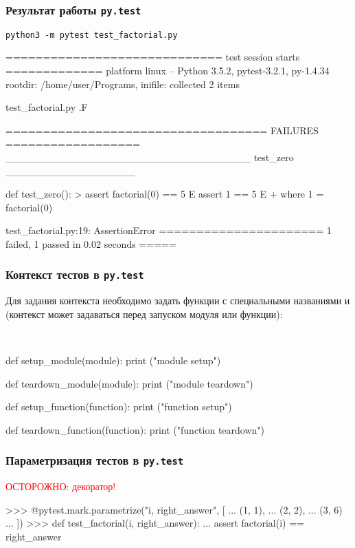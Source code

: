 \documentclass[fleqn, xcolor=x11names]{beamer}
\begin{document}
\begin{frame}[fragile]\frametitle{Результат работы \texttt{py.test}}

\texttt{python3 -m pytest test\_factorial.py}

\begin{pcode}
============================= test session starts =============
platform linux -- Python 3.5.2, pytest-3.2.1, py-1.4.34
rootdir: /home/user/Programs, inifile:
collected 2 items                                                               

test_factorial.py .F

=================================== FAILURES ==================
__________________________________ test_zero __________________

    def test_zero(): 
>       assert factorial(0) == 5
E       assert 1 == 5
E        +  where 1 = factorial(0)

test_factorial.py:19: AssertionError
====================== 1 failed, 1 passed in 0.02 seconds =====
\end{pcode}
\end{frame}

\begin{frame}[fragile]\frametitle{Контекст тестов в \texttt{py.test}}
Для задания контекста необходимо задать функции с специальными названиями  и  (контекст может задаваться перед запуском модуля или функции):

\

\begin{pcode}
def setup_module(module):
    print ("module setup")

def teardown_module(module):
    print ("module teardown")

def setup_function(function):
    print ("function setup")

def teardown_function(function):
    print ("function teardown")
\end{pcode}
\end{frame}

\begin{frame}[fragile]\frametitle{Параметризация тестов в \texttt{py.test}}
\textcolor{red}{ОСТОРОЖНО: декоратор!}

\begin{pcode}
>>> @pytest.mark.parametrize("i, right_answer", [
...     (1, 1),
...     (2, 2),
...     (3, 6)
... ])
>>> def test_factorial(i, right_answer):
...     assert factorial(i) == right_answer
\end{pcode}
\end{frame}
\end{document}

